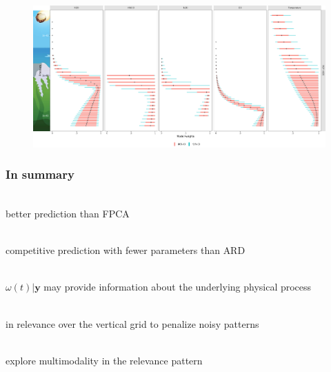 \documentclass{snedecorbeamer}
\begin{document}
\begin{frame}[c]
  \begin{figure}
    \centering
    \includegraphics[width=1\textwidth]{image2934-8.png}
  \end{figure}
\end{frame}

\begin{frame}
  \frametitle{In summary}

  \begingroup
  \begin{description}[<+->]
  \item[No dimension reduction] \mbox{}\\
    better prediction than \textsc{FPCA}
  \item[Parsimony] \mbox{}\\
    competitive prediction with fewer parameters than \textsc{ARD}
  \item[Interpretability] \mbox{}\\
    $\omega(t) | \mathbf{y}$ may provide information about the underlying
    physical process
  \item[Smoothness] \mbox{}\\
    in relevance over the vertical grid to penalize noisy patterns
  \item[Next steps] \mbox{}\\
    explore multimodality in the relevance pattern
  \end{description}
  \endgroup
\end{frame}
\end{document}
